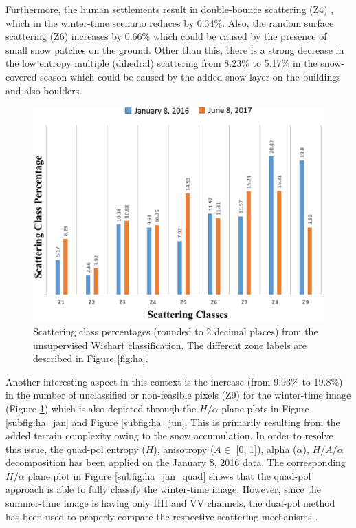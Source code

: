 \documentclass[review]{elsarticle}
\numberwithin{equation}{section}
\numberwithin{figure}{section}
\numberwithin{table}{section}
\begin{document}
Furthermore, the human settlements result in double-bounce scattering (Z4) \citep{Brunner2009}, which in the winter-time scenario reduces by 0.34\%. Also, the random surface scattering (Z6) increases by 0.66\% which could be caused by the presence of small snow patches on the ground. Other than this, there is a strong decrease in the low entropy multiple (dihedral) scattering from 8.23\% to 5.17\% in the snow-covered season which could be caused by the added snow layer on the buildings and also boulders.

\begin{figure}[htb]
    \centering
    \includegraphics[width=\textwidth]{Figures/Results/Percent.png}
    \caption{Scattering class percentages (rounded to 2 decimal places) from the unsupervised Wishart classification. The different zone labels are described in Figure \ref{fig:ha}.}
    \label{fig:percent}
\end{figure}

Another interesting aspect in this context is the increase (from 9.93\% to 19.8\%) in the number of unclassified or non-feasible pixels (Z9) for the winter-time image (Figure \ref{fig:percent}) which is also depicted through the $H/{\alpha}$ plane plots in Figure \ref{subfig:ha_jan} and Figure \ref{subfig:ha_jun}. This is primarily resulting from the added terrain complexity owing to the snow accumulation. In order to resolve this issue, the quad-pol entropy ($H$), anisotropy ($A \in$ [0, 1]), alpha ($\alpha$), $H/A/{\alpha}$ decomposition has been applied on the January 8, 2016 data. The corresponding $H/{\alpha}$ plane plot in Figure \ref{subfig:ha_jan_quad} shows that the quad-pol approach is able to fully classify the winter-time image. However, since the summer-time image is having only HH and VV channels, the dual-pol method has been used to properly compare the respective scattering mechanisms \citep{Majumdar2019}.
\end{document}
